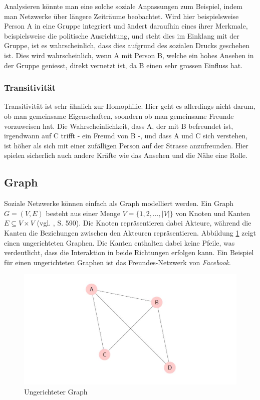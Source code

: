 Analysieren könnte man eine solche soziale Anpassungen zum Beispiel, indem man Netzwerke über längere Zeiträume
beobachtet. Wird hier beispielsweise Person A in eine Gruppe integriert und ändert daraufhin eines ihrer Merkmale,
beispielsweise die politische Ausrichtung, und steht dies im Einklang mit der Gruppe, ist es wahrscheinlich, dass dies
aufgrund des sozialen Drucks geschehen ist. Dies wird wahrscheinlich, wenn A mit Person B, welche ein hohes Ansehen in
der Gruppe geniesst, direkt vernetzt ist, da B einen sehr grossen Einfluss hat.

\subsubsection{Transitivität}
Transitivität ist sehr ähnlich zur Homophilie. Hier geht es allerdings nicht darum, ob man gemeinsame Eigenschaften,
soondern ob man gemeinsame Freunde vorzuweisen hat. Die Wahrscheinlichkeit, dass A, der mit B befreundet ist, irgendwann
auf C trifft - ein Freund von B -, und dass A und C sich verstehen, ist höher als sich mit einer zufälligen Person auf
der Strasse anzufreunden. Hier spielen sicherlich auch andere Kräfte wie das Ansehen und die Nähe eine Rolle.

\subsection{Graph}
Soziale Netzwerke können einfach als Graph modelliert werden.
Ein Graph $G = (V, E)$ besteht aus einer Menge $V = \{1,2,...,|V|\}$ von Knoten und Kanten $E \subseteq V\times V $ (vgl. \citeauthor{ottmann_algorithmen_2017} \citeyear{ottmann_algorithmen_2017}, S. 590).
Die Knoten repräsentieren dabei Akteure, während die Kanten die Beziehungen zwischen den Akteuren repräsentieren.
Abbildung \ref{fig:graph_undirected} zeigt einen ungerichteten Graphen. Die Kanten enthalten dabei keine Pfeile, was verdeutlicht, dass die Interaktion in beide Richtungen erfolgen kann.
Ein Beispiel für einen ungerichteten Graphen ist das Freundes-Netzwerk von \textit{Facebook}.

\begin{figure}[h]
    \centering
    \includegraphics[scale=0.7]{resources/graph_undirected.JPG}
    \caption{Ungerichteter Graph}
    \label{fig:graph_undirected}
\end{figure}

